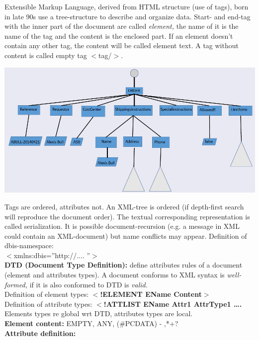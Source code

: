 \documentclass{article}
\begin{document}
Extensible Markup Language, derived from HTML structure (use of tags), born in late 90s use a tree-structure to describe and organize data.
Start- and end-tag with the inner part of the document are called \textit{element, }the name of it is the name of the tag and the content is the enclosed part. If an element doesn't contain any other tag, the content will be called element text. A tag without content is called empty tag $\mathrm{<}$tag/$\mathrm{>}$.
\begin{center}
\includegraphics[scale = 0.55]{image1.png}
\end{center}
Tags are ordered, attributes not. An XML-tree is ordered (if depth-first search will reproduce the document order). The textual corresponding representation is called serialization.
It is possible document-recursion (e.g. a message in XML could contain an XML-document) but name conflicts may appear.
Definition of dbis-namespace:\\ $\mathrm{<}$xmlns:dbis=''http://.... ''$\mathrm{>}$\\
\textbf{DTD (Document Type Definition): }define attributes rules of a document (element and attributes types). A document conforms to XML syntax is \textit{well-formed, }if it is also conformed to DTD is \textit{valid.}\\
Definition of element types: \textbf{$\boldsymbol{\mathrm{<}}$!ELEMENT EName Content$\boldsymbol{\mathrm{>}}$}\\
Definition of attribute types: \textbf{$\boldsymbol{\mathrm{<}}$!ATTLIST EName Attr1 AttrType1 {\dots}.}\\
Elements types re global wrt DTD, attributes types are local.\\
\textbf{Element content: }EMPTY, ANY, (\#PCDATA) - ,{\textbar}*+?\\
\textbf{Attribute definition:}\\
\end{document}
